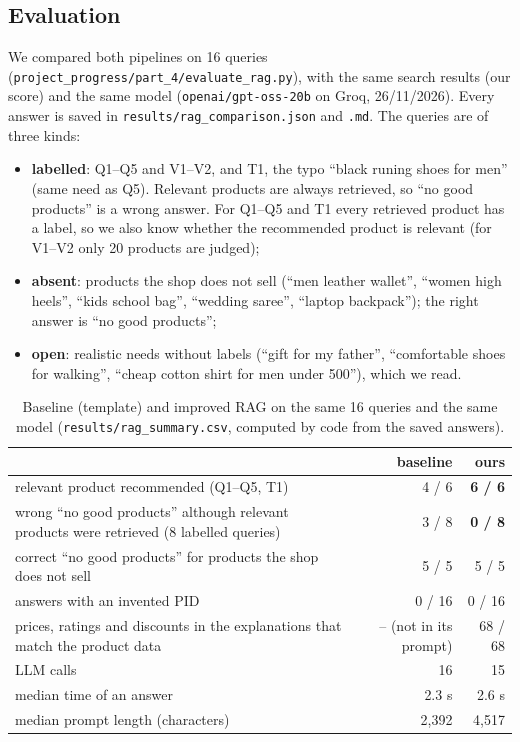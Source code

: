\documentclass[11pt,a4paper]{article}
\newcommand{\best}[1]{\textbf{#1}}
\newcommand{\code}[1]{\texttt{#1}}
\begin{document}
\subsection{Evaluation}
We compared both pipelines on 16 queries (\code{project\_progress/part\_4/evaluate\_rag.py}), with the same search
results (our score) and the same model (\code{openai/gpt-oss-20b} on Groq, 26/11/2026). Every answer is saved in
\code{results/rag\_comparison.json} and \code{.md}. The queries are of three kinds:
\begin{itemize}
\item \textbf{labelled}: Q1--Q5 and V1--V2, and T1, the typo ``black runing shoes for men'' (same need as Q5). Relevant
products are always retrieved, so ``no good products'' is a wrong answer. For Q1--Q5 and T1 every retrieved product has a
label, so we also know whether the recommended product is relevant (for V1--V2 only 20 products are judged);
\item \textbf{absent}: products the shop does not sell (``men leather wallet'', ``women high heels'', ``kids school
bag'', ``wedding saree'', ``laptop backpack''); the right answer is ``no good products'';
\item \textbf{open}: realistic needs without labels (``gift for my father'', ``comfortable shoes for walking'', ``cheap
cotton shirt for men under 500''), which we read.
\end{itemize}

\begin{table}[H]
\centering\small
\caption{Baseline (template) and improved RAG on the same 16 queries and the same model
(\code{results/rag\_summary.csv}, computed by code from the saved answers).}
\label{tab:rag}
\begin{tabularx}{\textwidth}{@{}Yrr@{}}
\toprule
 & baseline & ours\\
\midrule
relevant product recommended (Q1--Q5, T1) & 4 / 6 & \best{6 / 6}\\
wrong ``no good products'' although relevant products were retrieved (8 labelled queries) & 3 / 8 & \best{0 / 8}\\
correct ``no good products'' for products the shop does not sell & 5 / 5 & 5 / 5\\
answers with an invented PID & 0 / 16 & 0 / 16\\
prices, ratings and discounts in the explanations that match the product data & -- (not in its prompt) & 68 / 68\\
LLM calls & 16 & 15\\
median time of an answer & 2.3 s & 2.6 s\\
median prompt length (characters) & 2,392 & 4,517\\
\bottomrule
\end{tabularx}
\end{table}
\end{document}

